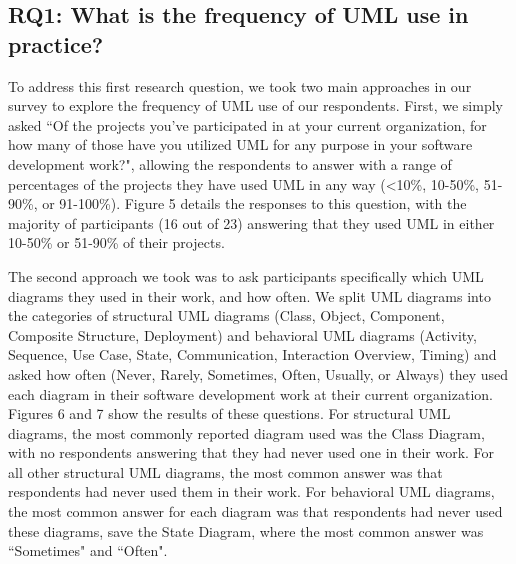 \documentclass[letterpaper, 10 pt, conference]{ieeeconf}  %
\begin{document}
   
\subsection{RQ1: What is the frequency of UML use in practice?}

To address this first research question, we took two main approaches in our survey to explore the frequency of UML use of our respondents. First, we simply asked ``Of the projects you've participated in at your current organization, for how many of those have you utilized UML for any purpose in your software development work?", allowing the respondents to answer with a range of percentages of the projects they have used UML in any way (\textless 10\%, 10-50\%, 51-90\%, or 91-100\%). Figure 5 details the responses to this question, with the majority of participants (16 out of 23) answering that they used UML in either 10-50\% or 51-90\% of their projects.

The second approach we took was to ask participants specifically which UML diagrams they used in their work, and how often. We split UML diagrams into the categories of structural UML diagrams (Class, Object, Component, Composite Structure, Deployment) and behavioral UML diagrams (Activity, Sequence, Use Case, State, Communication, Interaction Overview, Timing) and asked how often (Never, Rarely, Sometimes, Often, Usually, or Always) they used each diagram in their software development work at their current organization. Figures 6 and 7 show the results of these questions. For structural UML diagrams, the most commonly reported diagram used was the Class Diagram, with no respondents answering that they had never used one in their work. For all other structural UML diagrams, the most common answer was that respondents had never used them in their work. For behavioral UML diagrams, the most common answer for each diagram was that respondents had never used these diagrams, save the State Diagram, where the most common answer was ``Sometimes" and ``Often".
	
    \begin{figure}[!htb]
      \centering
      \label{RQ1Concl}
   \end{figure}
   
\end{document}
